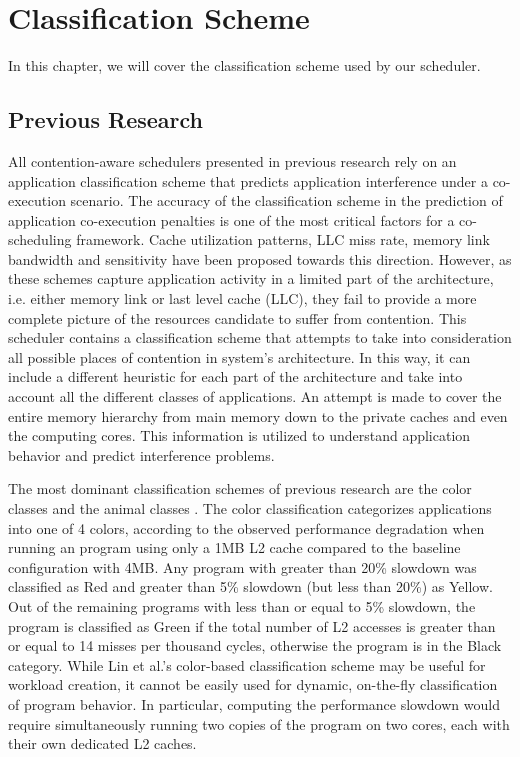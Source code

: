 \documentclass[diploma]{Styles/softlab-thesis}
\begin{document}
\chapter{Classification Scheme}

In this chapter, we will cover the classification scheme used by our scheduler.

\section{Previous Research}

All contention-aware schedulers presented in previous research rely on an application classification scheme that predicts application interference under a co-execution scenario. The accuracy of the classification scheme in the prediction of application co-execution penalties is one of the most critical factors for a co-scheduling framework. Cache utilization patterns, LLC miss rate, memory link bandwidth and sensitivity have been proposed towards this direction. However, as these schemes capture application activity in a limited part of the architecture, i.e. either memory link or last level cache (LLC), they fail to provide a more complete picture of the resources candidate to suffer from contention. This scheduler contains a classification scheme that attempts to take into consideration all possible places of contention in system's architecture. In this way, it can include a different heuristic for each part of the architecture and take into account all the different classes of applications. An attempt is made to cover the entire memory hierarchy from main memory down to the private caches and even the computing cores. This information is utilized to understand application behavior and predict interference problems.

The most dominant classification schemes of previous research are the color classes \cite{reference16} and the animal classes \cite{reference15}. The color classification categorizes applications into one of 4 colors, according to the observed performance degradation when running an program using only a 1MB L2 cache compared to the baseline configuration with 4MB. Any program with greater than 20\% slowdown was classified as Red and greater than 5\% slowdown (but less than 20\%) as Yellow. Out of the remaining programs with less than or equal to 5\% slowdown, the program is classified as Green if the total number of L2 accesses is greater than or equal to 14 misses per thousand cycles, otherwise the program is in the Black category. While Lin et al.’s color-based classification scheme may be useful for workload creation, it cannot be easily used for dynamic, on-the-fly classification of program behavior. In particular, computing the performance slowdown would require simultaneously running two copies of the program on two cores, each with their own dedicated L2 caches. \\
\end{document}
